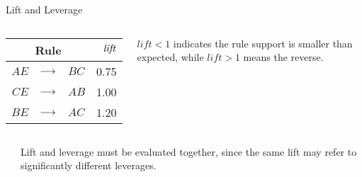 \begin{frame}{Lift and Leverage}
  \begin{columns}

\begin{center}
\begin{tabular}{|r>{\centering}m{0.2in}l|r|}
\hline
\multicolumn{3}{|c|}{Rule} & $\mathit{lift}$ \\ \hline
$\mathit{AE}$ & $\arule$ & $\mathit{BC}$ & 0.75 \\ \hline
$\mathit{CE}$ & $\arule$ & $\mathit{AB}$ & 1.00 \\ \hline
$\mathit{BE}$ & $\arule$ & $\mathit{AC}$ & 1.20 \\ \hline
\end{tabular}
\end{center}

\begin{minipage}{0.7\textwidth}
$lift < 1$ indicates the rule support is smaller than expected, while $lift>1$ means the reverse.
\end{minipage}

\end{columns}

\bigskip

\begin{columns}


\begin{center}
\end{center}
	
\begin{center}
\begin{minipage}{0.7\textwidth}
Lift and leverage must be evaluated together, since the same lift may refer to significantly different leverages.
\end{minipage}
\end{center}
\end{columns}
\end{frame}


